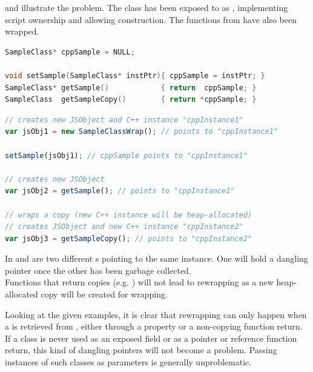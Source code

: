  and  illustrate the problem. The class  has been exposed to  as , implementing script ownership and allowing construction. The functions from  have also been wrapped.

\SingleSpacing
\begin{lstlisting}[language=C++, caption=Example for dangling pointers (\myProperName{C++}), label=lst:DanglingCPP]
SampleClass* cppSample = NULL;

void setSample(SampleClass* instPtr){ cppSample = instPtr; }
SampleClass* getSample()            { return  cppSample; }
SampleClass  getSampleCopy()        { return *cppSample; }
\end{lstlisting}
\OnehalfSpacing

\SingleSpacing
\begin{lstlisting}[language=JavaScript, caption=Example for dangling pointers (\myProperName{JavaScript}), label=lst:DanglingJS]
// creates new JSObject and C++ instance "cppInstance1"
var jsObj1 = new SampleClassWrap(); // points to "cppInstance1"

setSample(jsObj1); // cppSample points to "cppInstance1"

// creates new JSObject
var jsObj2 = getSample(); // points to "cppInstance1"

// wraps a copy (new C++ instance will be heap-allocated)
// creates JSObject and new C++ instance "cppInstance2"
var jsObj3 = getSampleCopy(); // points to "cppInstance2"
\end{lstlisting}
\OnehalfSpacing

In   and  are two different s pointing to the same  instance. One will hold a dangling pointer once the other has been garbage collected.\\
Functions that return copies (e.g. ) will not lead to rewrapping as a new heap-allocated copy will be created for wrapping.

Looking at the given examples, it is clear that rewrapping can only happen when a  is retrieved from , either through a property or  a non-copying function return. If a class is never used as an exposed field or as a pointer or reference function return, this kind of dangling pointers will not become a problem. Passing instances of such classes as parameters is generally unproblematic.

